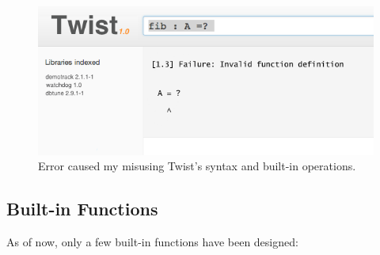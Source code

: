 \begin{figure}[!ht]
    \centering
    \includegraphics[width=\textwidth]{images/error}
    \caption{Error caused my misusing Twist's syntax and built-in operations.}
    \label{fig:error}
\end{figure}

\subsection{Built-in Functions}
\label{sec:functions}
 
As of now, only a few built-in functions have been designed:

